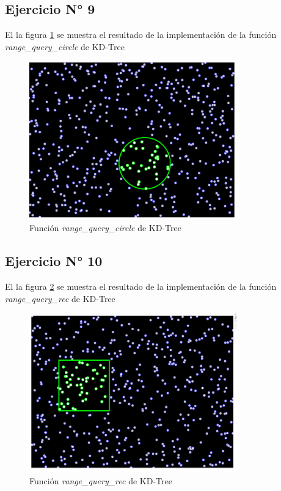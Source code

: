 \documentclass{article}
\begin{document}
\subsection{Ejercicio N° 9}
El la figura \ref{fig:ejercicio_09} se muestra el resultado de la implementación de la función \textit{range\_query\_circle} de KD-Tree
\begin{figure}[h!]
	\centering
	\includegraphics[width=0.8\textwidth]{img/ejercicio_09.png}
	\caption{Función \textit{range\_query\_circle} de KD-Tree}
	\label{fig:ejercicio_09}
\end{figure}

\clearpage
\subsection{Ejercicio N° 10}
El la figura \ref{fig:ejercicio_10} se muestra el resultado de la implementación de la función \textit{range\_query\_rec} de KD-Tree
\begin{figure}[h!]
	\centering
	\includegraphics[width=0.8\textwidth]{img/ejercicio_10.png}
	\caption{Función \textit{range\_query\_rec} de KD-Tree}
	\label{fig:ejercicio_10}
\end{figure}
\end{document}
